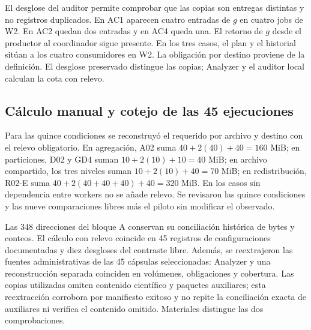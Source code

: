 El desglose del auditor permite comprobar que las copias son entregas distintas y no registros duplicados. En AC1 aparecen cuatro entradas de $g$ en cuatro jobs de W2. En AC2 quedan dos entradas y en AC4 queda una. El retorno de $g$ desde el productor al coordinador sigue presente. En los tres casos, el plan y el historial sitúan a los cuatro consumidores en W2. La obligación por destino proviene de la definición. El desglose preservado distingue las copias; Analyzer y el auditor local calculan la cota con relevo.

\subsection{Cálculo manual y cotejo de las 45 ejecuciones}
Para las quince condiciones se reconstruyó el requerido por archivo y destino con el relevo obligatorio. En agregación, A02 suma $40+2(40)+40=160$ MiB; en particiones, D02 y GD4 suman $10+2(10)+10=40$ MiB; en archivo compartido, los tres niveles suman $10+2(10)+40=70$ MiB; en redistribución, R02-E suma $40+2(40+40+40)+40=320$ MiB. En los casos sin dependencia entre workers no se añade relevo. Se revisaron las quince condiciones y las nueve comparaciones libres más el piloto sin modificar el observado.

Las 348 direcciones del bloque A conservan su conciliación histórica de bytes y conteos. El cálculo con relevo coincide en 45 registros de configuraciones documentadas y diez desgloses del contraste libre. Además, se reextrajeron las fuentes administrativas de las 45 cápsulas seleccionadas: Analyzer y una reconstrucción separada coinciden en volúmenes, obligaciones y cobertura. Las copias utilizadas omiten contenido científico y paquetes auxiliares; esta reextracción corrobora por manifiesto exitoso y no repite la conciliación exacta de auxiliares ni verifica el contenido omitido. Materiales distingue las dos comprobaciones.


